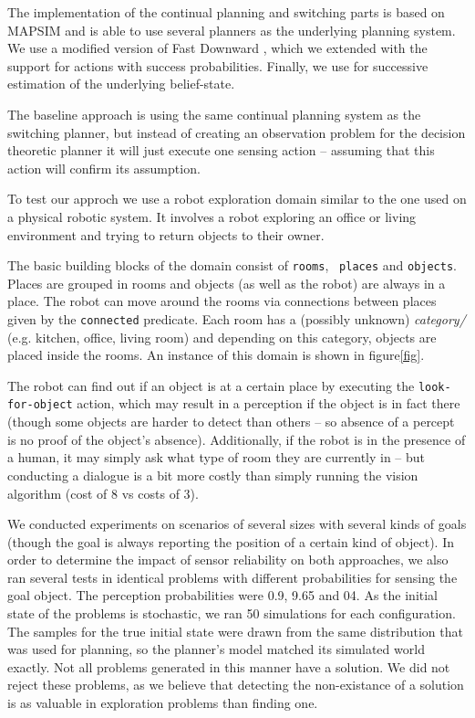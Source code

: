 

The implementation of the continual planning and switching parts is
based on MAPSIM \cite{brenner:nebel:jaamas09} and is able to use
several planners as the underlying planning system. We use a modified
version of Fast Downward \cite{fast-downward}, which we extended with
the support for actions with success probabilities. Finally, we use
 \cite{king:2009} for successive estimation of the
underlying belief-state.

The baseline approach is using the same continual planning system as
the switching planner, but instead of creating an observation problem
for the decision theoretic planner it will just execute one sensing
action -- assuming that this action will confirm its assumption.

To test our approch we use a robot exploration domain similar to the
one used on a physical robotic system. It involves a robot exploring
an office or living environment and trying to return objects to their
owner.

The basic building blocks of the domain consist of {\tt rooms}, {\tt
places} and {\tt objects}. Places are grouped in rooms and objects (as
well as the robot) are always in a place. The robot can move around
the rooms via connections between places given by the {\tt connected}
predicate. Each room has a (possibly unknown) {\em category/}
(e.g. kitchen, office, living room) and depending on this category,
objects are placed inside the rooms. An instance of this domain is
shown in figure\ref{fig}.

The robot can find out if an object is at a certain place by executing
the {\tt look-for-object} action, which may result in a perception if
the object is in fact there (though some objects are harder to detect
than others -- so absence of a percept is no proof of the object's
absence). Additionally, if the robot is in the presence of a human, it
may simply ask what type of room they are currently in -- but
conducting a dialogue is a bit more costly than simply running the
vision algorithm (cost of 8 vs costs of 3).

We conducted experiments on scenarios of several sizes with several
kinds of goals (though the goal is always reporting the position of a
certain kind of object). In order to determine the impact of sensor
reliability on both approaches, we also ran several tests in identical
problems with different probabilities for sensing the goal object. The
perception probabilities were 0.9, 9.65 and 04. As the initial state
of the problems is stochastic, we ran 50 simulations for each
configuration. The samples for the true initial state were drawn from
the same distribution that was used for planning, so the planner's
model matched its simulated world exactly. Not all problems generated
in this manner have a solution. We did not reject these problems, as
we believe that detecting the non-existance of a solution is as valuable
in exploration problems than finding one.

